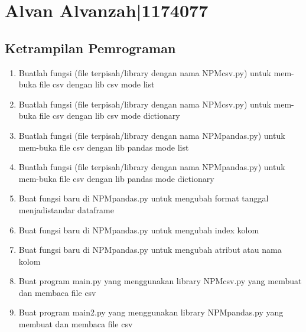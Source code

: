 \begin{enumerate}
\end{enumerate}
\section{Alvan Alvanzah|1174077}
\subsection{Ketrampilan Pemrograman}

\begin{enumerate}
    \item Buatlah  fungsi  (file  terpisah/library  dengan  nama  NPMcsv.py)  untuk  mem-buka file csv dengan lib csv mode list
    
    
    \item Buatlah  fungsi  (file  terpisah/library  dengan  nama  NPMcsv.py)  untuk  mem-buka file csv dengan lib csv mode dictionary
    
    
    \item Buatlah fungsi (file terpisah/library dengan nama NPMpandas.py) untuk mem-buka file csv dengan lib pandas mode list
    
    
    \item Buatlah fungsi (file terpisah/library dengan nama NPMpandas.py) untuk mem-buka file csv dengan lib pandas mode dictionary
    
    
    \item Buat fungsi baru di NPMpandas.py untuk mengubah format tanggal menjadistandar dataframe
    
    
    \item Buat fungsi baru di NPMpandas.py untuk mengubah index kolom
    
    
    \item Buat fungsi baru di NPMpandas.py untuk mengubah atribut atau nama kolom
    
    
    \item Buat program main.py yang menggunakan library NPMcsv.py yang membuat dan membaca file csv
    
    
    \item Buat program main2.py yang menggunakan library NPMpandas.py yang membuat dan membaca file csv
    
\end{enumerate}

